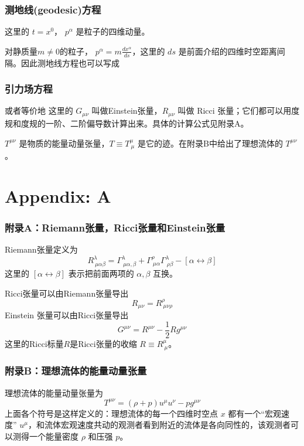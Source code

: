 \documentclass[CJK,13pt]{beamer}
\begin{document}
\begin{frame}
  \frametitle{测地线(geodesic)方程}
  这里的 $t=x^0$， $p^\alpha$ 是粒子的四维动量。

  \skipline

  对静质量$m\ne 0$的粒子， {\blue $p^\alpha = m\frac{dx^\alpha}{ds}$}，这里的 $ds$ 是前面介绍的四维时空距离间隔。因此测地线方程也可以写成
  
\end{frame}



\begin{frame}
  \frametitle{引力场方程}
  或者等价地
  这里的 $G_{\mu\nu}$ 叫做Einstein张量，$R_{\mu\nu}$ 叫做 Ricci 张量；它们都可以用度规和度规的一阶、二阶偏导数计算出来。具体的计算公式见附录A。

  $T^{\mu\nu}$ 是物质的能量动量张量，$T\equiv T^\mu_{\ \mu}$ 是它的迹。在附录B中给出了理想流体的 $T^{\mu\nu}$。
\end{frame}


\section{Appendix: A}

\begin{frame}
  \frametitle{附录A：Riemann张量，Ricci张量和Einstein张量}
  Riemann张量定义为
  $$R^\lambda_{\ \mu\alpha\beta} = \Gamma^\lambda_{\ \mu\alpha,\beta} + \Gamma^\rho_{\ \mu\alpha}\Gamma^\lambda_{\ \rho\beta} -[\alpha \leftrightarrow\beta]$$
  这里的 $[\alpha \leftrightarrow\beta]$ 表示把前面两项的 $\alpha,\beta$ 互换。

  Ricci张量可以由Riemann张量导出
  $$  R_{\mu\nu} = R^\rho_{\ \mu\nu\rho}$$
  Einstein 张量可以由Ricci张量导出
  $$ G^{\mu\nu} = R^{\mu\nu}-\frac{1}{2}R g^{\mu\nu}$$
  这里的Ricci标量$R$是Ricci张量的收缩 $R\equiv R^\mu_{\ \mu}$。
\end{frame}


\begin{frame}
  \frametitle{附录B：理想流体的能量动量张量}
  理想流体的能量动量张量为
  $$ T^{\mu\nu} = (\rho+p)u^\mu u^\nu - p g^{\mu\nu}$$
  上面各个符号是这样定义的：理想流体的每一个四维时空点 $x$ 都有一个“宏观速度” $u^\mu$，和流体宏观速度共动的观测者看到附近的流体是各向同性的，该观测者可以测得一个能量密度 $\rho$ 和压强 $p$。
\end{frame}


\ech
\end{document}
